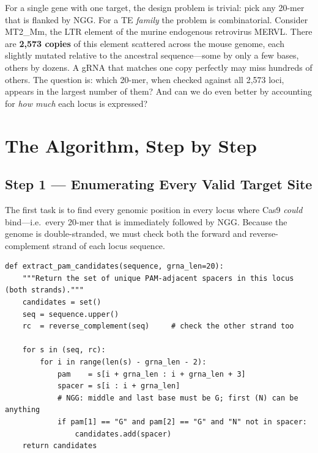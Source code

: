 \documentclass[11pt]{article}
\begin{document}
For a single gene with one target, the design problem is trivial: pick any 20-mer that is
flanked by NGG.  For a TE \emph{family} the problem is combinatorial.  Consider MT2\_Mm, the
LTR element of the murine endogenous retrovirus MERVL.  There are \textbf{2,573 copies} of
this element scattered across the mouse genome, each slightly mutated relative to the
ancestral sequence---some by only a few bases, others by dozens.  A gRNA that matches one
copy perfectly may miss hundreds of others.  The question is: which 20-mer, when checked
against all 2,573 loci, appears in the largest number of them?  And can we do even better
by accounting for \emph{how much} each locus is expressed?

\section{The Algorithm, Step by Step}

\subsection{Step 1 --- Enumerating Every Valid Target Site}

The first task is to find every genomic position in every locus where Cas9 \emph{could}
bind---i.e.\ every 20-mer that is immediately followed by NGG.  Because the genome is
double-stranded, we must check both the forward and reverse-complement strand of each locus
sequence.

\begin{lstlisting}[style=pycode,
  caption={PAM-site scanning.  For each locus sequence we slide a window of length
    $\ell + 3$ (spacer + PAM), check whether the last two bases are GG, and if so
    record the 20-mer spacer.  The reverse complement is checked identically.}]
def extract_pam_candidates(sequence, grna_len=20):
    """Return the set of unique PAM-adjacent spacers in this locus (both strands)."""
    candidates = set()
    seq = sequence.upper()
    rc  = reverse_complement(seq)     # check the other strand too

    for s in (seq, rc):
        for i in range(len(s) - grna_len - 2):
            pam    = s[i + grna_len : i + grna_len + 3]
            spacer = s[i : i + grna_len]
            # NGG: middle and last base must be G; first (N) can be anything
            if pam[1] == "G" and pam[2] == "G" and "N" not in spacer:
                candidates.add(spacer)
    return candidates
\end{lstlisting}
\end{document}
